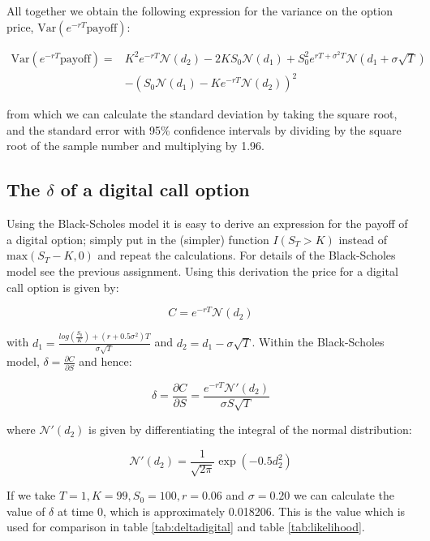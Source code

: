 \documentclass[11pt,a4paper]{article}
\begin{document}
All together we obtain the following expression for the variance on the option price, $\text{Var}(e^{-rT}\text{payoff})$:

\begin{align}
  \label{eq:var}
  \text{Var}(e^{-rT}\text{payoff}) =& K^2e^{-rT}\mathcal{N}(d_2)-2KS_0\mathcal{N}(d_1) + S_0^2e^{rT+\sigma^2T}\mathcal{N}(d_1+\sigma \sqrt{T}) \nonumber \\
  &-(S_0\mathcal{N}(d_1) - Ke^{-rT}\mathcal{N}(d_2))^2 
\end{align}

from which we can calculate the standard deviation by taking the square root, and the standard error with 95\% confidence intervals by dividing by the square root of the sample number and multiplying by 1.96.

\subsection{The $\delta$ of a digital call option}
Using the Black-Scholes model it is easy to derive an expression for the payoff of a digital option; simply put in the (simpler) function $I(S_T > K)$ instead of $\text{max}(S_T - K, 0)$ and repeat the calculations. For details of the Black-Scholes model see the previous assignment. Using this derivation the price for a digital call option is given by:

\begin{equation}
  C = e^{-rT}\mathcal{N}(d_2)
\end{equation}

with $d_1 = \frac{log(\frac{S_0}{K}) + (r + 0.5\sigma^2)T}{\sigma \sqrt{T}}$ and $d_2 = d_1 - \sigma \sqrt{T}$. Within the Black-Scholes model, $\delta = \frac{\partial C}{\partial S}$ and hence:

\begin{equation}
  \label{eq:deltadigital}
  \delta = \frac{\partial C}{\partial S} = \frac{e^{-rT}\mathcal{N}'(d_2)}{\sigma S \sqrt{T}}
\end{equation}

where $\mathcal{N}'(d_2)$ is given by differentiating the integral of the normal distribution:

\begin{equation}
  \mathcal{N}'(d_2) = \frac{1}{\sqrt{2\pi}} \exp{(-0.5d_2^2)}
\end{equation}

If we take $T = 1, K = 99, S_0 = 100, r = 0.06$ and $\sigma = 0.20$ we can calculate the value of $\delta$ at time 0, which is approximately 0.018206. This is the value which is used for comparison in table \ref{tab:deltadigital} and table \ref{tab:likelihood}.
\end{document}
